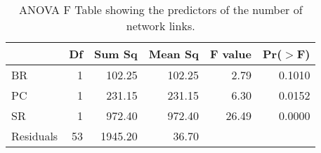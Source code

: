 \begin{table}[ht]
\centering
\begin{tabular}{lrrrrr}
  \hline
 & Df & Sum Sq & Mean Sq & F value & Pr($>$F) \\ 
  \hline
BR & 1 & 102.25 & 102.25 & 2.79 & 0.1010 \\ 
  PC & 1 & 231.15 & 231.15 & 6.30 & 0.0152 \\ 
  SR & 1 & 972.40 & 972.40 & 26.49 & 0.0000 \\ 
  Residuals & 53 & 1945.20 & 36.70 &  &  \\ 
   \hline
\end{tabular}
\caption{ANOVA F Table showing the predictors of the number of network links.} 
\label{tab:L_aov}
\end{table}
